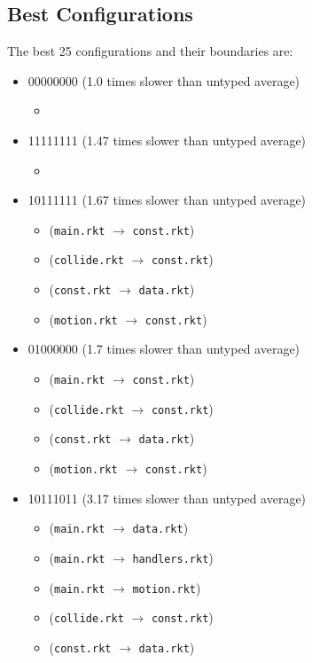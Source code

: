 \documentclass{article}
\newcommand{\mono}[1]{\texttt{#1}}
\begin{document}
\subsection{Best Configurations}
The best 25 configurations and their boundaries are:
\begin{itemize}
\item 00000000 (1.0 times slower than untyped average)
  \begin{itemize}
  \item 
  \end{itemize}
\item 11111111 (1.47 times slower than untyped average)
  \begin{itemize}
  \item 
  \end{itemize}
\item 10111111 (1.67 times slower than untyped average)
  \begin{itemize}
  \item (\mono{main.rkt} $\rightarrow$ \mono{const.rkt})
  \item (\mono{collide.rkt} $\rightarrow$ \mono{const.rkt})
  \item (\mono{const.rkt} $\rightarrow$ \mono{data.rkt})
  \item (\mono{motion.rkt} $\rightarrow$ \mono{const.rkt})
  \end{itemize}
\item 01000000 (1.7 times slower than untyped average)
  \begin{itemize}
  \item (\mono{main.rkt} $\rightarrow$ \mono{const.rkt})
  \item (\mono{collide.rkt} $\rightarrow$ \mono{const.rkt})
  \item (\mono{const.rkt} $\rightarrow$ \mono{data.rkt})
  \item (\mono{motion.rkt} $\rightarrow$ \mono{const.rkt})
  \end{itemize}
\item 10111011 (3.17 times slower than untyped average)
  \begin{itemize}
  \item (\mono{main.rkt} $\rightarrow$ \mono{data.rkt})
  \item (\mono{main.rkt} $\rightarrow$ \mono{handlers.rkt})
  \item (\mono{main.rkt} $\rightarrow$ \mono{motion.rkt})
  \item (\mono{collide.rkt} $\rightarrow$ \mono{const.rkt})
  \item (\mono{const.rkt} $\rightarrow$ \mono{data.rkt})

\end{itemize}
\end{itemize}
\end{document}
